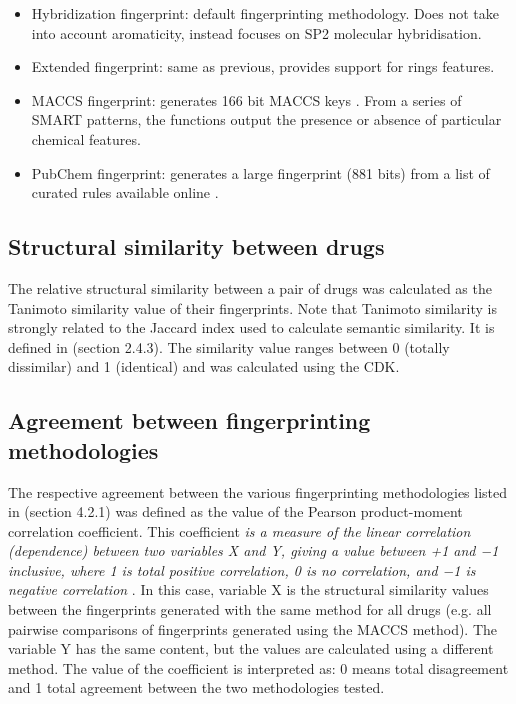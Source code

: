 \begin{itemize}
  \item Hybridization fingerprint: default fingerprinting methodology. Does not take into account aromaticity, instead focuses on SP2 molecular hybridisation.
  \item Extended fingerprint: same as previous, provides support for rings features.
  \item MACCS fingerprint: generates 166 bit MACCS keys \citep{fpdalke}. From a series of SMART patterns, the functions output the presence or absence of particular chemical features.
  \item PubChem fingerprint: generates a large fingerprint (881 bits) from a list of curated rules available online \citep{pubchemfp}.
\end{itemize}

\subsection{Structural similarity between drugs}
The relative structural similarity between a pair of drugs was calculated as the Tanimoto similarity value \citep{tanimoto1958elementary} of their fingerprints. Note that Tanimoto similarity is strongly related to the Jaccard index used to calculate semantic similarity. It is defined in (section 2.4.3). The similarity value ranges between 0 (totally dissimilar) and 1 (identical) and was calculated using the CDK.

\subsection{Agreement between fingerprinting methodologies}
The respective agreement between the various fingerprinting methodologies listed in (section 4.2.1) was defined as the value of the Pearson product-moment correlation coefficient. This coefficient \emph{is a measure of the linear correlation (dependence) between two variables X and Y, giving a value between +1 and −1 inclusive, where 1 is total positive correlation, 0 is no correlation, and −1 is negative correlation} \citep{hane1993pearson}. In this case, variable X is the structural similarity values between the fingerprints generated with the same method for all drugs (e.g. all pairwise comparisons of fingerprints generated using the MACCS method). The variable Y has the same content, but the values are calculated using a different method. The value of the coefficient is interpreted as: 0 means total disagreement and 1 total agreement between the two methodologies tested.

